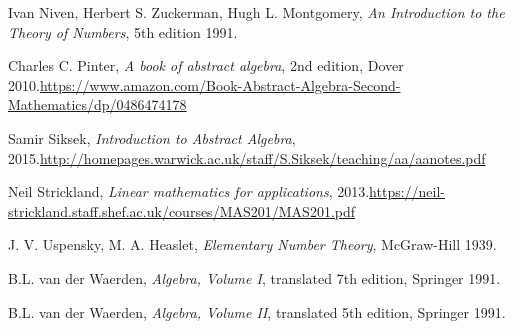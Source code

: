 \documentclass[numbers=enddot,12pt,final,onecolumn,notitlepage]{scrartcl}%
\numberwithin{exer}{subsection}
\theoremstyle{definition}
\begin{document}
\begin{thebibliography}{999999999}
Ivan Niven, Herbert S. Zuckerman, Hugh L.
Montgomery, \textit{An Introduction to the Theory of Numbers}, 5th edition 1991.

Charles C. Pinter, \textit{A book of abstract
algebra}, 2nd edition, Dover 2010.\newline\url{https://www.amazon.com/Book-Abstract-Algebra-Second-Mathematics/dp/0486474178}

Samir Siksek, \textit{Introduction to Abstract
Algebra}, 2015.\newline\url{http://homepages.warwick.ac.uk/staff/S.Siksek/teaching/aa/aanotes.pdf}

Neil Strickland, \textit{Linear mathematics for
applications}, 2013.\newline\url{https://neil-strickland.staff.shef.ac.uk/courses/MAS201/MAS201.pdf}

J. V. Uspensky, M. A. Heaslet,
\textit{Elementary Number Theory}, McGraw-Hill 1939.

B.L. van der Waerden, \textit{Algebra, Volume I},
translated 7th edition, Springer 1991.

B.L. van der Waerden, \textit{Algebra, Volume
II}, translated 5th edition, Springer 1991.
\end{thebibliography}
\end{document}
